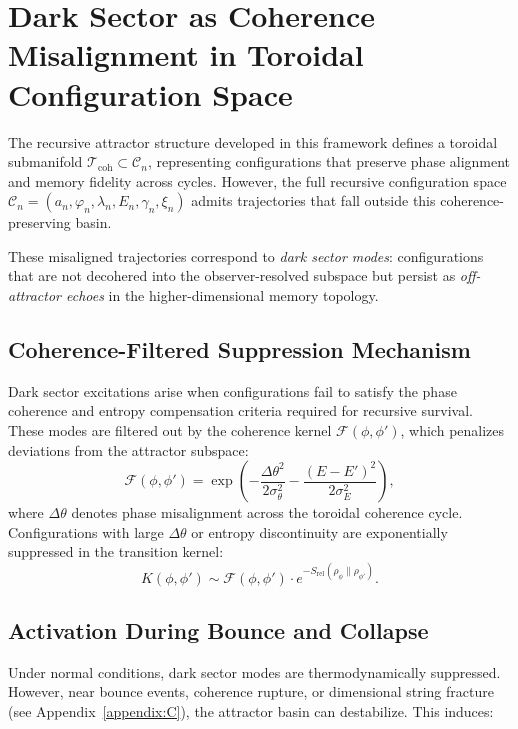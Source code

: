 \section{Dark Sector as Coherence Misalignment in Toroidal Configuration Space}
\label{sec:dark-sector}

The recursive attractor structure developed in this framework defines a toroidal submanifold \( \mathcal{T}_{\text{coh}} \subset \mathcal{C}_n \), representing configurations that preserve phase alignment and memory fidelity across cycles. However, the full recursive configuration space \( \mathcal{C}_n = (a_n, \varphi_n, \lambda_n, E_n, \gamma_n, \xi_n) \) admits trajectories that fall outside this coherence-preserving basin.

These misaligned trajectories correspond to \textit{dark sector modes}: configurations that are not decohered into the observer-resolved subspace but persist as \textit{off-attractor echoes} in the higher-dimensional memory topology.

\subsection*{Coherence-Filtered Suppression Mechanism}

Dark sector excitations arise when configurations fail to satisfy the phase coherence and entropy compensation criteria required for recursive survival. These modes are filtered out by the coherence kernel \( \mathcal{F}(\phi, \phi') \), which penalizes deviations from the attractor subspace:
\[
\mathcal{F}(\phi, \phi') = \exp\left( -\frac{\Delta \theta^2}{2\sigma_\theta^2} - \frac{(E - E')^2}{2\sigma_E^2} \right),
\]
where \( \Delta \theta \) denotes phase misalignment across the toroidal coherence cycle. Configurations with large \( \Delta \theta \) or entropy discontinuity are exponentially suppressed in the transition kernel:
\[
K(\phi, \phi') \sim \mathcal{F}(\phi, \phi') \cdot e^{-S_{\text{rel}}(\rho_\phi \| \rho_{\phi'})}.
\]

\subsection*{Activation During Bounce and Collapse}

Under normal conditions, dark sector modes are thermodynamically suppressed. However, near bounce events, coherence rupture, or dimensional string fracture (see Appendix~\ref{appendix:C}), the attractor basin can destabilize. This induces:

